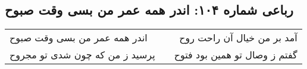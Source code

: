 \begin{center}
\section*{رباعی شماره ۱۰۴: اندر همه عمر من بسی وقت صبوح}
\label{sec:sh104}
\begin{longtable}{l p{0.5cm} r}
اندر همه عمر من بسی وقت صبوح
&&
آمد بر من خیال آن راحت روح
\\
پرسید ز من که چون شدی تو مجروح
&&
گفتم ز وصال تو همین بود فتوح
\\
\end{longtable}
\end{center}
